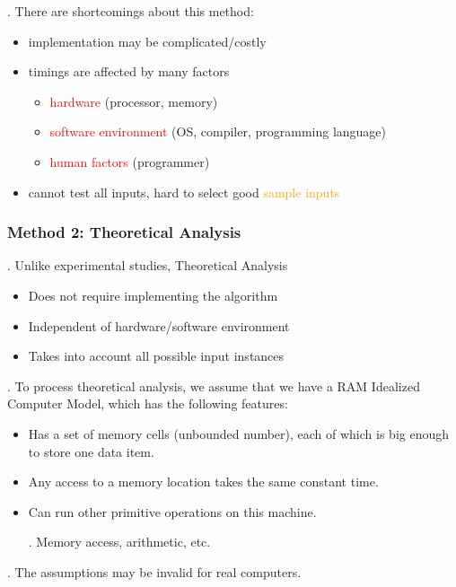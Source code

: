 \documentclass{article}
\begin{document}
\begin{comm}[].
    There are shortcomings about this method: 
    \begin{itemize}
        \item implementation may be complicated/costly
        \item timings are affected by many factors
        \begin{itemize}
            \item \textcolor{red}{hardware} (processor, memory)
            \item \textcolor{red}{software environment} (OS, compiler, programming language)
            \item \textcolor{red}{human factors} (programmer)
        \end{itemize}
        \item cannot test all inputs, hard to select good \textcolor{orange}{sample inputs}
    \end{itemize}
\end{comm}

\subsubsection{Method 2: Theoretical Analysis}

\begin{thmm}[].
    Unlike experimental studies, Theoretical Analysis \begin{itemize}
        \item Does not require implementing the algorithm 
        \item Independent of hardware/software environment 
        \item Takes into account all possible input instances
    \end{itemize}
\end{thmm}

\begin{deff}.
    To process theoretical analysis, we assume that we have a RAM Idealized Computer Model, which has the following features: 
    \begin{itemize}
        \item Has a set of memory cells (unbounded number), each of which is big enough to store one data item. 
        \item Any access to a memory location takes the same constant time. 
        \item Can run other primitive operations on this machine. 
        \begin{examplee}[].
            Memory access, arithmetic, etc. 
        \end{examplee}
    \end{itemize}
    \begin{comm}[].
        The assumptions may be invalid for real computers. 
    \end{comm}
\end{deff}
\end{document}
